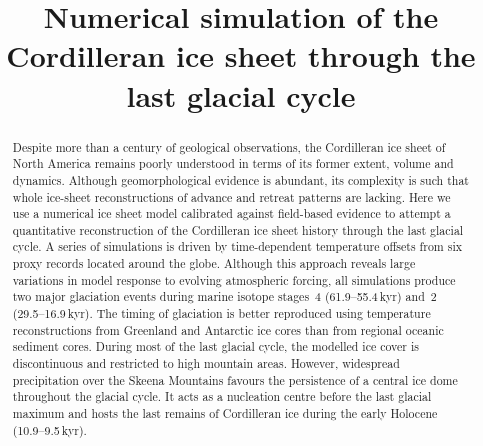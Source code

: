 \documentclass[tc, manuscript]{copernicus}
\begin{document}
\linenumbers

\title{Numerical simulation of the Cordilleran ice sheet
       through the last glacial cycle}




\received{}
\pubdiscuss{}
\revised{}
\accepted{}
\published{}

\maketitle

\begin{abstract}

  Despite more than a century of geological observations, the Cordilleran ice
  sheet of North America remains poorly understood in terms of its former
  extent, volume and dynamics. Although geomorphological evidence is abundant,
  its complexity is such that whole ice-sheet reconstructions of advance and
  retreat patterns are lacking. Here we use a numerical ice sheet model
  calibrated against field-based evidence to attempt a quantitative
  reconstruction of the Cordilleran ice sheet history through the last glacial
  cycle. A series of simulations is driven by time-dependent temperature
  offsets from six proxy records located around the globe. Although this
  approach reveals large variations in model response to evolving atmospheric
  forcing, all simulations produce two major glaciation events during
  marine isotope stages~4 (61.9--55.4\,kyr) and~2
  (29.5--16.9\,kyr). The timing of glaciation is
  better reproduced using temperature reconstructions from Greenland and
  Antarctic ice cores than from regional oceanic sediment cores. During most of
  the last glacial cycle, the modelled ice cover is discontinuous and
  restricted to high mountain areas. However, widespread precipitation over the
  Skeena Mountains favours the persistence of a central ice dome throughout the
  glacial cycle. It acts as a nucleation centre before the last glacial maximum
  and hosts the last remains of Cordilleran ice during the
  early Holocene (10.9--9.5\,kyr).

\end{abstract}
\end{document}
